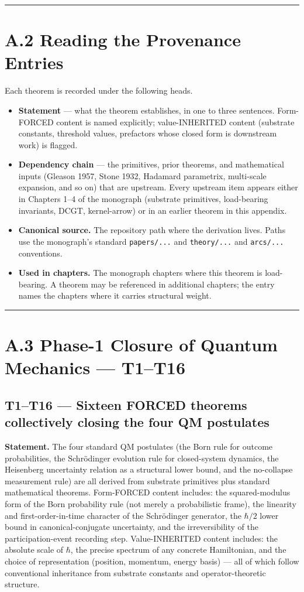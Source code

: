 \documentclass[11pt]{book}
\begin{document}
\bigskip\hrule\bigskip

\section{A.2 Reading the Provenance Entries}

Each theorem is recorded under the following heads.

\begin{itemize}
\item \textbf{Statement} — what the theorem establishes, in one to three sentences. Form-FORCED content is named explicitly; value-INHERITED content (substrate constants, threshold values, prefactors whose closed form is downstream work) is flagged.
\item \textbf{Dependency chain} — the primitives, prior theorems, and mathematical inputs (Gleason 1957, Stone 1932, Hadamard parametrix, multi-scale expansion, and so on) that are upstream. Every upstream item appears either in Chapters 1–4 of the monograph (substrate primitives, load-bearing invariants, DCGT, kernel-arrow) or in an earlier theorem in this appendix.
\item \textbf{Canonical source.} The repository path where the derivation lives. Paths use the monograph's standard \texttt{papers/...} and \texttt{theory/...} and \texttt{arcs/...} conventions.
\item \textbf{Used in chapters.} The monograph chapters where this theorem is load-bearing. A theorem may be referenced in additional chapters; the entry names the chapters where it carries structural weight.
\end{itemize}

\bigskip\hrule\bigskip

\section{A.3 Phase-1 Closure of Quantum Mechanics — T1–T16}

\subsection{T1–T16 — Sixteen FORCED theorems collectively closing the four QM postulates}

\textbf{Statement.} The four standard QM postulates (the Born rule for outcome probabilities, the Schrödinger evolution rule for closed-system dynamics, the Heisenberg uncertainty relation as a structural lower bound, and the no-collapse measurement rule) are all derived from substrate primitives plus standard mathematical theorems. Form-FORCED content includes: the squared-modulus form of the Born probability rule (not merely a probabilistic frame), the linearity and first-order-in-time character of the Schrödinger generator, the $\hbar/2$ lower bound in canonical-conjugate uncertainty, and the irreversibility of the participation-event recording step. Value-INHERITED content includes: the absolute scale of $\hbar$, the precise spectrum of any concrete Hamiltonian, and the choice of representation (position, momentum, energy basis) — all of which follow conventional inheritance from substrate constants and operator-theoretic structure.
\end{document}

